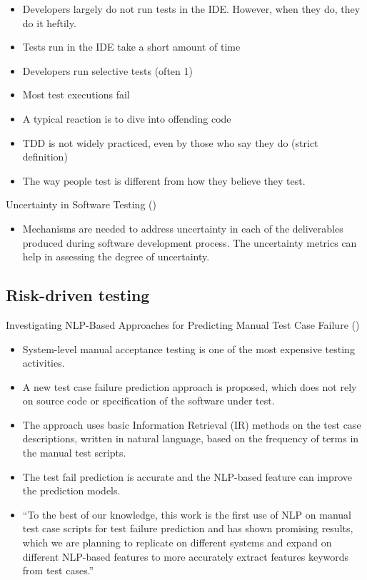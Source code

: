 \documentclass[]{book}
\providecommand{\tightlist}{%
  \setlength{\itemsep}{0pt}\setlength{\parskip}{0pt}}
\begin{document}
\begin{itemize}
\tightlist
\item
  Developers largely do not run tests in the IDE. However, when they do,
  they do it heftily.
\item
  Tests run in the IDE take a short amount of time
\item
  Developers run selective tests (often 1)
\item
  Most test executions fail
\item
  A typical reaction is to dive into offending code
\item
  TDD is not widely practiced, even by those who say they do (strict
  definition)
\item
  The way people test is different from how they believe they test.
\end{itemize}

Uncertainty in Software Testing (\citet{moiz2017uncertainty})

\begin{itemize}
\tightlist
\item
  Mechanisms are needed to address uncertainty in each of the
  deliverables produced during software development process. The
  uncertainty metrics can help in assessing the degree of uncertainty.
\end{itemize}

\subsection{Risk-driven testing}\label{risk-driven-testing}

Investigating NLP-Based Approaches for Predicting Manual Test Case
Failure (\citet{hemmati2018})

\begin{itemize}
\tightlist
\item
  System-level manual acceptance testing is one of the most expensive
  testing activities.
\item
  A new test case failure prediction approach is proposed, which does
  not rely on source code or specification of the software under test.
\item
  The approach uses basic Information Retrieval (IR) methods on the test
  case descriptions, written in natural language, based on the frequency
  of terms in the manual test scripts.
\item
  The test fail prediction is accurate and the NLP-based feature can
  improve the prediction models.
\item
  ``To the best of our knowledge, this work is the first use of NLP on
  manual test case scripts for test failure prediction and has shown
  promising results, which we are planning to replicate on different
  systems and expand on different NLP-based features to more accurately
  extract features keywords from test cases.''
\end{itemize}
\end{document}
